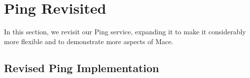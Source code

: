 % 
% 
% 
% 
% 
% 
\section{Ping Revisited}
\label{sec:ping}

In this section, we revisit our Ping service, expanding it to make it
considerably more flexible and to demonstrate more aspects of Mace.



\subsection{Revised Ping Implementation}
\label{sec:ping-implementation}

